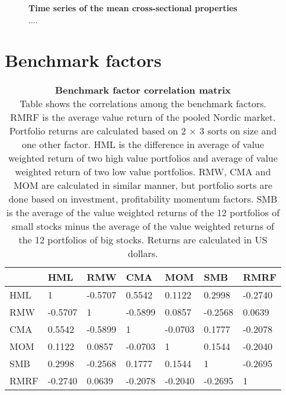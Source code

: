 \documentclass{article}
\begin{document}
\begin{figure}[ht]
\centering
\caption[Time series of the mean cross-sectional properties]{\textbf{Time series of the mean cross-sectional properties}\\ ....}

\label{plot:variableTS}
\end{figure}

\clearpage

\section{Benchmark factors}
\renewcommand{\thefigure}{B.\arabic{figure}}
\setcounter{figure}{0}
\renewcommand{\thetable}{B.\arabic{table}}
\setcounter{table}{0}

\begin{table}[ht]
\small
\caption[Benchmark factor correlation matrix]{\textbf{Benchmark factor correlation matrix}\\ Table shows the correlations among the benchmark factors. RMRF is the average value return of the pooled Nordic market. Portfolio returns are calculated based on 2 × 3 sorts on size and one other factor. HML is the difference in average of value weighted return of two high value portfolios and average of value weighted return of two low value portfolios. RMW, CMA and MOM are calculated in similar manner, but portfolio sorts are done based on investment, profitability momentum factors. SMB is the average of the value weighted returns of the 12 portfolios of small stocks minus the average of the value weighted returns of the 12 portfolios of big stocks. Returns are calculated in US dollars.}
\label{table:FFfactorsCorrelations}
\centering
{}
\begin{tabularx}{\textwidth}{@{\extracolsep{4pt}} X Y Y Y Y Y Y} 
\toprule
& HML & RMW & CMA & MOM & SMB & RMRF \\
\midrule
HML & 1 & -0.5707 & 0.5542 & 0.1122 & 0.2998 & -0.2740 \\
RMW & -0.5707 & 1 & -0.5899 & 0.0857 & -0.2568 & 0.0639 \\
CMA & 0.5542 & -0.5899 & 1 & -0.0703 & 0.1777 & -0.2078 \\
MOM & 0.1122 & 0.0857 & -0.0703 & 1 & 0.1544 & -0.2040 \\
SMB & 0.2998 & -0.2568 & 0.1777 & 0.1544 & 1 & -0.2695 \\
RMRF & -0.2740 & 0.0639 & -0.2078 & -0.2040 & -0.2695 & 1 \\
\bottomrule
\end{tabularx}
\end{table}
\end{document}

